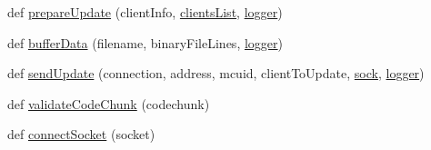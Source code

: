 \begin{DoxyCompactItemize}
\item 
def \hyperlink{namespaceserver_a4ab7e63c5f934dfea50b006468f9efca}{prepare\+Update} (client\+Info, \hyperlink{namespaceserver_acc42864cdf2e6dd395c42dd780cbde1d}{clients\+List}, \hyperlink{namespaceserver_abfa1d56012bc320e4b26361390f6fc24}{logger})
\item 
def \hyperlink{namespaceserver_a6098d5cffff301a01e793c84215c4512}{buffer\+Data} (filename, binary\+File\+Lines, \hyperlink{namespaceserver_abfa1d56012bc320e4b26361390f6fc24}{logger})
\item 
def \hyperlink{namespaceserver_a4889d0db3f3503cc61340252fabc2c24}{send\+Update} (connection, address, mcuid, client\+To\+Update, \hyperlink{namespaceserver_a995df52292d049e26620aefae8eb4e1d}{sock}, \hyperlink{namespaceserver_abfa1d56012bc320e4b26361390f6fc24}{logger})
\item 
def \hyperlink{namespaceserver_ad6f5a9a8c8e233d0537dc69dc6de98f6}{validate\+Code\+Chunk} (codechunk)
\item 
def \hyperlink{namespaceserver_a5dce7c3abe85653dccf395dfb4f4b664}{connect\+Socket} (socket)
\end{DoxyCompactItemize}
